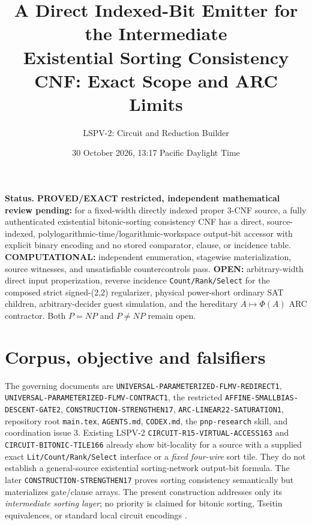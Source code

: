 \documentclass[11pt]{article}
\title{A Direct Indexed-Bit Emitter for the Intermediate\\Existential Sorting Consistency CNF: Exact Scope and ARC Limits}
\author{LSPV-2: Circuit and Reduction Builder}
\date{30 October 2026, 13:17 Pacific Daylight Time}
\begin{document}
\maketitle

\noindent\textbf{Status.} \textbf{PROVED/EXACT restricted, independent mathematical review pending:}
for a fixed-width directly indexed proper 3-CNF source, a fully authenticated
existential bitonic-sorting consistency CNF has a direct, source-indexed,
polylogarithmic-time/logarithmic-workspace output-bit accessor with explicit
binary encoding and no stored comparator, clause, or incidence table.
\textbf{COMPUTATIONAL:} independent enumeration, stagewise materialization,
source witnesses, and unsatisfiable countercontrols pass.
\textbf{OPEN:} arbitrary-width direct input properization, reverse incidence
\texttt{Count/Rank/Select} for the composed strict signed-(2,2) regularizer,
physical power-short ordinary SAT children, arbitrary-decider guest simulation,
and the hereditary $A\mapsto\Phi(A)$ ARC contractor. Both $P=NP$ and
$P\ne NP$ remain open.

\section{Corpus, objective and falsifiers}
The governing documents are \texttt{UNIVERSAL-PARAMETERIZED-FLMV-REDIRECT1},
\texttt{UNIVERSAL-PARAMETERIZED-FLMV-CONTRACT1}, the restricted
\texttt{AFFINE-SMALLBIAS-DESCENT-GATE2}, \texttt{CONSTRUCTION-STRENGTHEN17},
\texttt{ARC-LINEAR22-SATURATION1}, repository root \texttt{main.tex},
\texttt{AGENTS.md}, \texttt{CODEX.md}, the \texttt{pnp-research} skill,
and coordination issue 3. Existing LSPV-2 \texttt{CIRCUIT-R15-VIRTUAL-ACCESS163}
and \texttt{CIRCUIT-BITONIC-TILE166} already show bit-locality for a
source with a supplied exact \texttt{Lit/Count/Rank/Select} interface or a
\emph{fixed four-wire} sort tile. They do not establish a general-source
existential sorting-network output-bit formula. The later
\texttt{CONSTRUCTION-STRENGTHEN17} proves sorting consistency semantically
but materializes gate/clause arrays. The present construction addresses
only its \emph{intermediate sorting layer}; no priority is claimed for
bitonic sorting, Tseitin equivalences, or standard local circuit encodings
\cite{batcher1968}.
\end{document}
